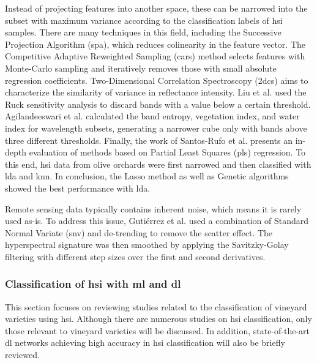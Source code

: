 Instead of projecting features into another space, these can be narrowed into the subset with maximum variance according to the classification labels of \acrshort{hsi} samples. There are many techniques in this field, including the Successive Projection Algorithm (\acrshort{spa}), which reduces colinearity in the feature vector. The Competitive Adaptive Reweighted Sampling (\acrshort{cars}) method selects features with Monte-Carlo sampling and iteratively removes those with small absolute regression coefficients. Two-Dimensional Correlation Spectroscopy (\acrshort{2dcs}) aims to characterize the similarity of variance in reflectance intensity. Liu et al. \cite{liu_dimension_2019} used the Ruck sensitivity analysis to discard bands with a value below a certain threshold. Agilandeeswari et al. \cite{agilandeeswari_crop_2022} calculated the band entropy, vegetation index, and water index for wavelength subsets, generating a narrower cube only with bands above three different thresholds. Finally, the work of Santos-Rufo et al. \cite{santos-rufo_wavelength_2020} presents an in-depth evaluation of methods based on Partial Least Squares (\acrshort{pls}) regression. To this end, \acrshort{hsi} data from olive orchards were first narrowed and then classified with \acrshort{lda} and \acrshort{knn}. In conclusion, the Lasso method \cite{friedman_regularization_2010} as well as Genetic algorithms \cite{mehmood_review_2012} showed the best performance with \acrshort{lda}. 

Remote sensing data typically contains inherent noise, which means it is rarely used as-is. To address this issue, Gutiérrez et al. \cite{gutierrez_--go_2018} used a combination of Standard Normal Variate (\acrshort{snv}) and de-trending to remove the scatter effect. The hyperspectral signature was then smoothed by applying the Savitzky-Golay filtering with different step sizes over the first and second derivatives.

\subsubsection{Classification of \acrshort{hsi} with \acrshort{ml} and \acrshort{dl}}

This section focuses on reviewing studies related to the classification of vineyard varieties using \acrshort{hsi}. Although there are numerous studies on \acrshort{hsi} classification, only those relevant to vineyard varieties will be discussed. In addition, state-of-the-art \acrshort{dl} networks achieving high accuracy in \acrshort{hsi} classification will also be briefly reviewed.

